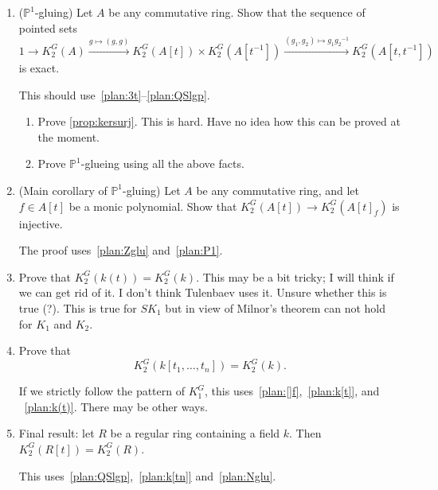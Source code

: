 \documentclass[oneside,12pt]{amsart}
\numberwithin{equation}{section}
\numberwithin{lem}{section}
\theoremstyle{definition}
\theoremstyle{remark}
\DeclareMathOperator{\St}{St^G}
\newcommand{\Pro}{\mathbb{P}}
\newcommand{\st}{\scriptstyle}
\begin{document}
\begin{enumerate}
(i) If $Ah+B=A$, i.e. the natural map $B\to A/Ah$ is surjective, then for any $x\in \St(A_h)$ there exist
$y\in \St(A)$ and $z\in \St(B_h)$ such that
$x=F_h(y)z$.

(ii) If moreover $Ah\cap B=Bh$, i.e. $B/Bh\to A/Ah$ is an isomorphism, and $h$ is not a zero divisor in $A$, then
the sequence of pointed sets
$$
K_2^G(B)\xrightarrow{\st g\mapsto (F_h(g),g)} K_2^G(B_h)\times K_2^G(A)\xrightarrow{\st (g_1,g_2)\mapsto g_1F_h(g_2)^{-1}}
K_2^G(A_h)
$$
is exact.

This should use something from the proof of~\eqref{plan:QSlgp} or~\eqref{plan:Zglu}; see~\cite[Lemma 3.4]{St-poly}.

\item\label{plan:P1} ($\Pro^1$-gluing) Let $A$ be any commutative ring. Show that the sequence of pointed sets
$$
1\longrightarrow K_2^G(A)\xrightarrow{\st g\mapsto (g,g)} K_2^G(A[t])\times K_2^G(A[t^{-1}])
\xrightarrow{\st (g_1,g_2)\mapsto g_1{g_2}^{-1}} K_2^G(A[t,t^{-1}])
$$
is exact.

This should use~\eqref{plan:3t}--\eqref{plan:QSlgp}.

\begin{enumerate}
 \item Prove \cref{prop:kersurj}. This is hard. Have no idea how this can be proved at the moment.
 \item Prove $\Pro^1$-glueing using all the above facts.
\end{enumerate}

\item\label{plan:[]f} (Main corollary of $\Pro^1$-gluing) Let $A$ be any commutative ring, and let $f\in A[t]$ be a monic polynomial. Show that
$K_2^G(A[t])\to K_2^G(A[t]_f)$ is injective.

The proof uses~\eqref{plan:Zglu} and~\eqref{plan:P1}.

\item\label{plan:k(t)} Prove that $K_2^G(k(t))=K_2^G(k)$. This may be a bit tricky; I will think if we can get rid of it. I don't think Tulenbaev uses it.
Unsure whether this is true (?). This is true for $SK_1$ but in view of Milnor's theorem can not hold for $K_1$ and $K_2$.

\item\label{plan:k[tn]} Prove that
$$K_2^G(k[t_1,\ldots,t_n])=K_2^G(k).$$

If we strictly follow the pattern of $K_1^G$, this uses~\eqref{plan:[]f},~\eqref{plan:k[t]}, and
~\eqref{plan:k(t)}. There may be other ways.

\item \label{plan:final} Final result: let $R$ be a regular ring containing a field $k$. Then $K_2^G(R[t])=K_2^G(R)$.

This uses~\eqref{plan:QSlgp},~\eqref{plan:k[tn]} and~\eqref{plan:Nglu}.
\end{enumerate}
\end{document}
